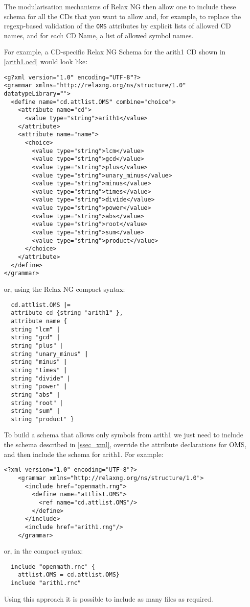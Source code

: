 \begin{appendix}
The modularisation mechanisms of Relax NG then allow one to include these schema for all
the CDs that you want to allow and, for example, to replace the regexp-based validation of
the \lstinline|OMS| attributes by explicit lists of allowed CD names, and for each CD
Name, a list of allowed symbol names.
  
    For example, a CD-specific Relax NG Schema for the arith1 CD shown in
    \ref{arith1.ocd} would look like:
\begin{lstlisting}
<g?xml version="1.0" encoding="UTF-8"?>
<grammar xmlns="http://relaxng.org/ns/structure/1.0" datatypeLibrary="">
  <define name="cd.attlist.OMS" combine="choice">
    <attribute name="cd">
      <value type="string">arith1</value>
    </attribute>
    <attribute name="name">
      <choice>
        <value type="string">lcm</value>
        <value type="string">gcd</value>
        <value type="string">plus</value>
        <value type="string">unary_minus</value>
        <value type="string">minus</value>
        <value type="string">times</value>
        <value type="string">divide</value>
        <value type="string">power</value>
        <value type="string">abs</value>
        <value type="string">root</value>
        <value type="string">sum</value>
        <value type="string">product</value>
      </choice>
    </attribute>
  </define>
</grammar>
\end{lstlisting}
or, using the Relax NG compact syntax:
\begin{lstlisting}
  cd.attlist.OMS |= 
  attribute cd {string "arith1" },
  attribute name {
  string "lcm" |
  string "gcd" |
  string "plus" |
  string "unary_minus" |
  string "minus" |
  string "times" |
  string "divide" |
  string "power" |
  string "abs" |
  string "root" |
  string "sum" |
  string "product" }
\end{lstlisting}

 To build a schema that allows only symbols from arith1 we just
  need to include the \OM schema described in \ref{ssec_xml}, override the attribute declarations for
  OMS, and then include the schema for arith1.  For example:
\begin{lstlisting}
<?xml version="1.0" encoding="UTF-8"?>
    <grammar xmlns="http://relaxng.org/ns/structure/1.0">
      <include href="openmath.rng">
        <define name="attlist.OMS">
          <ref name="cd.attlist.OMS"/>
        </define>
      </include>
      <include href="arith1.rng"/>
    </grammar>
\end{lstlisting}
    or, in the compact syntax:
\begin{lstlisting}
  include "openmath.rnc" {
    attlist.OMS = cd.attlist.OMS}
  include "arith1.rnc"
\end{lstlisting}
Using this approach it is possible to include as many files as required.


\end{appendix}
